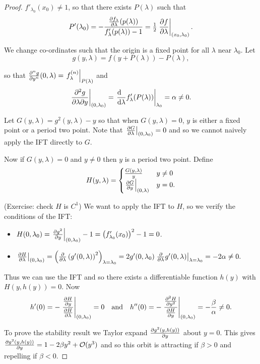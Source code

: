\documentclass{notes}
\newcommand{\cO}{\mathcal{O}}
\theoremstyle{plain}
\begin{document}
\begin{proof}
$f'_{\lambda_0}(x_0) \neq 1$, so that there exists $P(\lambda)$ such
that
\[
P'(\lambda_0) = -
\frac{\frac{\partial f_\lambda}{\partial \lambda}(p(\lambda))}{f'_\lambda(p(\lambda)) - 1}
= \tfrac{1}{2} \left.\frac{\partial f}{\partial \lambda}\right|_{(x_0,\lambda_0)}.
\]

We change co-ordinates such that the origin is a fixed point
for all $\lambda$ near $\lambda_0$. Let
\[
g(y,\lambda) = f(y+P(\lambda)) - P(\lambda),
\]

so that $\frac{\partial ^n g}{\partial y^n} (0,\lambda) = \left.f_{\lambda}^{(n)}
\right|_{P(\lambda)}$ and
\[
\left.\frac{\partial ^2 g}{\partial \lambda \partial y}\right|_{(0,\lambda_0)}
= \left.\frac{\mathrm{d}\phantom{\lambda}}{\mathrm{d}\lambda} f'_\lambda(P(\lambda))
\right|_{\lambda_0}
= \alpha \neq 0.
\]

Let $G(y,\lambda) =g^2(y,\lambda) - y$ so that when $G(y,\lambda) =
0$, $y$ is either a fixed point or a period two point.
Note that $\left.\frac{\partial G}{\partial \lambda}\right|_{(0,\lambda_0)} = 0$ and so
we cannot naively apply the IFT directly to $G$.

Now if $G(y,\lambda) = 0$ and $y \neq 0$ then $y$ is a period two point.
Define
\[
H(y,\lambda) = \begin{cases}
\frac{G(y,\lambda)}{y} & y \neq 0 \\
\left.\frac{\partial G}{\partial y}\right|_{(0,\lambda)} & y = 0.
\end{cases}
\]

(Exercise: check $H$ is $C^1$)  We want to apply the IFT to $H$, so
we verify the conditions of the IFT:

\begin{itemize}
\item $H(0,\lambda_0) = \left.\frac{\partial g^2}{\partial y}\right|_{(0,\lambda_0)}
- 1 = \left(f'_{\lambda_0}(x_0)\right)^2 -1 = 0$.
\item $\left.\frac{\partial H}{\partial \lambda}\right|_{(0,\lambda_0)}
= \left(\frac{\partial }{\partial \lambda} \left( g'(0,\lambda) \right)^2
\right)_{\lambda=\lambda_0}
= 2 g'(0,\lambda_0) \left.\frac{\partial }{\partial \lambda} g'(0,\lambda)
\right|_{\lambda = \lambda_0} = -2 \alpha \neq 0.$
\end{itemize}

Thus we can use the IFT and so there exists a differentiable function
$h(y)$ with $H(y,h(y)) = 0$.  Now
\[
h'(0) = - \left.\frac{\frac{\partial H}{\partial y}}{\frac{\partial H}{\partial \lambda}}\right|_{(0,\lambda_0)} = 0
\quad \text{and} \quad
h''(0) = - \left.\frac{\frac{\partial ^2 H}{\partial y^2}}{\frac{\partial H}{\partial y}}\right|_{(0,\lambda_0)}
 = - \frac{\beta}{\alpha} \neq 0.
\]

To prove the stability result we Taylor expand $\frac{\partial g^2(y,h(y))}{\partial y}$
about $y=0$.  This gives
$\pd{g^2(y,h(y))}{y} = 1 - 2 \beta y^2 + \cO(y^3)$ and so this
orbit is attracting if $\beta > 0$ and repelling if $\beta < 0$.
\end{proof}
\end{document}
